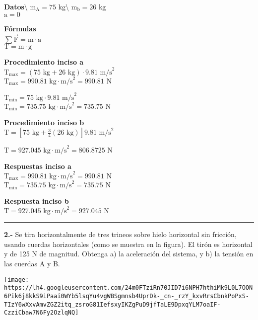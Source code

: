 \documentclass[
]{article}
\begin{document}
\textbf{Datos}\textbackslash{}
{\(\text{m}_{\text{A}} = 75\text{~kg}\)}\textbackslash{}
{\(\text{m}_{\text{b}} = 26\text{~kg}\)}\\
{\(\text{a} = 0\)}

\textbf{Fórmulas}\\
{\(\sum\overset{\rightarrow}{\text{F}} = \text{m} \cdot \text{a}\)}\\
{\(\text{T} = \text{m} \cdot \text{g}\)}

\textbf{Procedimiento inciso a}\\
{\(\text{T}_{\text{max}} = (75\text{~kg} + 26\text{~kg}) \cdot 9.81\text{~m/s}^{2}\)}\\
{\(\text{T}_{\text{max}} = 990.81\text{~kg} \cdot \text{m/s}^{2} = 990.81\text{~N}\)}

{\(\text{T}_{\text{min}} = 75\text{~kg} \cdot 9.81\text{~m/s}^{2}\)}\\
{\(\text{T}_{\text{min}} = 735.75\text{~kg} \cdot \text{m/s}^{2} = 735.75\text{~N}\)}

\textbf{Procedimiento inciso b}\\
{\(\text{T} = \left\lbrack 75\text{~kg} + \frac{3}{4}\left( 26\text{~kg} \right) \right\rbrack 9.81\text{~m/s}^{2}\)}

{\(\text{T} = 927.045\text{~kg} \cdot \text{m/s}^{2} = 806.8725\text{~N}\)}

\textbf{Respuestas inciso a}\\
{\(\text{T}_{\text{max}} = 990.81\text{~kg} \cdot \text{m/s}^{2} = 990.81\text{~N}\)}\\
{\(\text{T}_{\text{min}} = 735.75\text{~kg} \cdot \text{m/s}^{2} = 735.75\text{~N}\)}

\textbf{Respuesta inciso b}\\
{\(\text{T} = 927.045\text{~kg} \cdot \text{m/s}^{2} = 927.045\text{~N}\)}

\begin{center}\rule{0.5\linewidth}{0.5pt}\end{center}

\textbf{2.-} Se tira horizontalmente de tres trineos sobre hielo
horizontal sin fricción, usando cuerdas horizontales (como se muestra en
la figura). El tirón es horizontal y de 125 N de magnitud. Obtenga a) la
aceleración del sistema, y b) la tensión en las cuerdas A y B.

\texttt{[image: https://lh4.googleusercontent.com/24m0FTziRn70JID7i6NPH7hthiMk9L0L7OON6Pik6j8kkS9iPaai0WYb5lsqYu4vgWBSgmnsb4UprDk-\_cn-\_rzY\_kxvRrsCbnkPoPxS-TIzY6wXxvAmvZGZ2itq\_zsroG81IefsxyIKZgPuD9jfTaLE9DpxqYLM7oaIF-CzziCbaw7N6Fy2OzlqNQ]}
\end{document}

